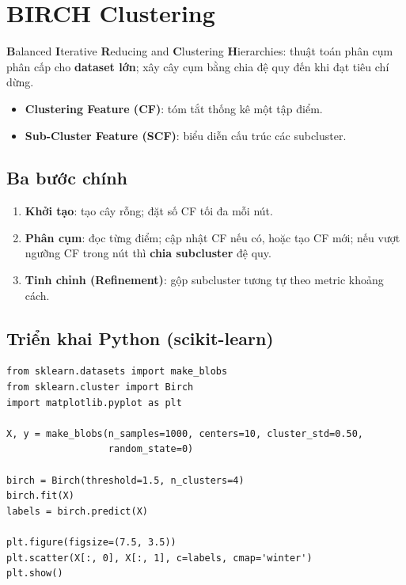 \section{BIRCH Clustering}
\label{sec:birch}

\begin{dinhnghia}[title={BIRCH}]
\textbf{B}alanced \textbf{I}terative \textbf{R}educing and \textbf{C}lustering \textbf{H}ierarchies:
thuật toán phân cụm phân cấp cho \textbf{dataset lớn}; xây cây cụm bằng chia đệ quy đến khi đạt tiêu chí dừng.
\end{dinhnghia}

\begin{ynghia}[title={CF và SCF}]
\begin{itemize}
  \item \textbf{Clustering Feature (CF)}: tóm tắt thống kê một tập điểm.
  \item \textbf{Sub-Cluster Feature (SCF)}: biểu diễn cấu trúc các subcluster.
\end{itemize}
\end{ynghia}

\subsection{Ba bước chính}

\begin{phuongphap}[title={Ba giai đoạn BIRCH}]
\begin{enumerate}
  \item \textbf{Khởi tạo}: tạo cây rỗng; đặt số CF tối đa mỗi nút.
  \item \textbf{Phân cụm}: đọc từng điểm; cập nhật CF nếu có, hoặc tạo CF mới; nếu vượt ngưỡng CF trong nút thì \textbf{chia subcluster} đệ quy.
  \item \textbf{Tinh chỉnh (Refinement)}: gộp subcluster tương tự theo metric khoảng cách.
\end{enumerate}
\end{phuongphap}

\subsection{Triển khai Python (scikit-learn)}

\begin{vidu}[title={Ví dụ Birch}]
\begin{lstlisting}
from sklearn.datasets import make_blobs
from sklearn.cluster import Birch
import matplotlib.pyplot as plt

X, y = make_blobs(n_samples=1000, centers=10, cluster_std=0.50,
                  random_state=0)

birch = Birch(threshold=1.5, n_clusters=4)
birch.fit(X)
labels = birch.predict(X)

plt.figure(figsize=(7.5, 3.5))
plt.scatter(X[:, 0], X[:, 1], c=labels, cmap='winter')
plt.show()
\end{lstlisting}
\end{vidu}

